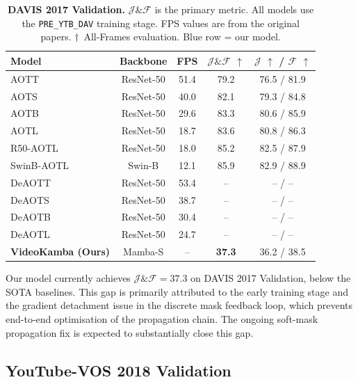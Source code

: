 \documentclass[11pt,a4paper]{article}
\begin{document}
\begin{table}[htbp]
\centering
\caption{%
  \textbf{DAVIS 2017 Validation.}
  $\mathcal{J}\&\mathcal{F}$ is the primary metric.
  All models use the \texttt{PRE\_YTB\_DAV} training stage.
  FPS values are from the original papers.
  $\dagger$~All-Frames evaluation.
  \colorbox{ourrow}{Blue row} = our model.
}
\label{tab:davis}
\setlength{\tabcolsep}{6pt}
\begin{tabular}{lcccc}
\toprule
\textbf{Model} & \textbf{Backbone} & \textbf{FPS} &
  $\mathcal{J}\&\mathcal{F}$ $\uparrow$ &
  $\mathcal{J}$ $\uparrow$ / $\mathcal{F}$ $\uparrow$ \\
\midrule
AOTT             & ResNet-50       & 51.4 & 79.2 & 76.5 / 81.9 \\
AOTS             & ResNet-50       & 40.0 & 82.1 & 79.3 / 84.8 \\
AOTB             & ResNet-50       & 29.6 & 83.3 & 80.6 / 85.9 \\
AOTL             & ResNet-50       & 18.7 & 83.6 & 80.8 / 86.3 \\
R50-AOTL         & ResNet-50       & 18.0 & 85.2 & 82.5 / 87.9 \\
SwinB-AOTL       & Swin-B          & 12.1 & 85.9 & 82.9 / 88.9 \\
\midrule
DeAOTT           & ResNet-50       & 53.4 & --   & -- / -- \\
DeAOTS           & ResNet-50       & 38.7 & --   & -- / -- \\
DeAOTB           & ResNet-50       & 30.4 & --   & -- / -- \\
DeAOTL           & ResNet-50       & 24.7 & --   & -- / -- \\
\midrule
\rowcolor{ourrow}
\textbf{VideoKamba (Ours)} & Mamba-S & -- &
  \textbf{37.3} & 36.2 / 38.5 \\
\bottomrule
\end{tabular}
\end{table}

Our model currently achieves $\mathcal{J}\&\mathcal{F} = 37.3$ on DAVIS 2017
Validation, below the SOTA baselines.  This gap is primarily attributed to
the early training stage and the gradient detachment issue in the discrete mask
feedback loop, which prevents end-to-end optimisation of the propagation
chain.  The ongoing soft-mask propagation fix is expected to substantially
close this gap.

\subsection{YouTube-VOS 2018 Validation}
\label{sec:ytbvos}
\end{document}
